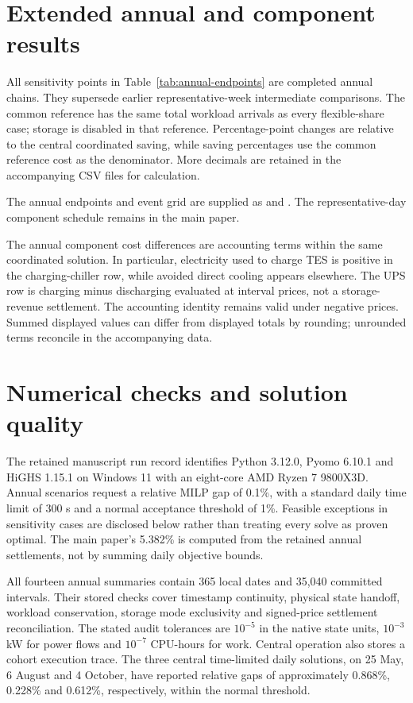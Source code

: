 \section{Extended annual and component results}
All sensitivity points in Table~\ref{tab:annual-endpoints} are completed annual chains. They supersede earlier representative-week intermediate comparisons. The common reference has the same total workload arrivals as every flexible-share case; storage is disabled in that reference. Percentage-point changes are relative to the central coordinated saving, while saving percentages use the common reference cost \textcolor{LatestGreen}{as the denominator}. More decimals are retained in the accompanying CSV files for calculation.


The annual endpoints and event grid are supplied as  and . The representative-day component schedule remains in the main paper.

The annual \textcolor{LatestGreen}{component cost} differences are accounting terms within the same coordinated solution. In particular, electricity used to charge TES is positive in the charging-chiller row, while avoided direct cooling appears elsewhere. The UPS row is charging minus discharging evaluated at interval prices, not a storage-revenue settlement. The accounting identity remains valid under negative prices. Summed displayed values can differ from displayed totals by rounding; unrounded terms reconcile in the accompanying data.

\section{Numerical checks and solution quality}
The retained manuscript run record identifies Python 3.12.0, Pyomo 6.10.1 and \textcolor{LatestGreen}{HiGHS 1.15.1 on Windows} 11 with an eight-core AMD Ryzen 7 9800X3D. Annual scenarios request a relative MILP gap of 0.1\%, with a standard daily time limit of 300 s and a normal acceptance threshold of 1\%. Feasible exceptions in sensitivity cases are disclosed below rather than treating every solve as proven optimal. The main paper's 5.382\% is computed from the retained annual settlements, not by summing daily objective bounds.

All fourteen annual summaries contain 365 local dates and 35,040 committed intervals. Their stored checks cover timestamp continuity, physical state handoff, workload conservation, storage mode exclusivity and signed-price settlement reconciliation. The stated audit tolerances are $10^{-5}$ in the native state units, $10^{-3}$ kW for power flows and $10^{-7}$ CPU-hours for work. Central operation also stores a cohort execution trace. The three central time-limited daily solutions, on 25 May, 6 August and 4 October, have reported relative gaps of approximately 0.868\%, 0.228\% and 0.612\%, respectively, within the normal threshold.

